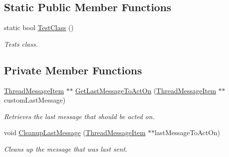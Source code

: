 \subsection*{Static Public Member Functions}
\begin{DoxyCompactItemize}
\item 
static bool \hyperlink{class_thread_single_message_keep_last_adbab8972129d51d509f20d5d575a393b}{TestClass} ()
\begin{DoxyCompactList}\small\item\em Tests class. \item\end{DoxyCompactList}\end{DoxyCompactItemize}
\subsection*{Private Member Functions}
\begin{DoxyCompactItemize}
\item 
\hyperlink{class_thread_message_item}{ThreadMessageItem} $\ast$$\ast$ \hyperlink{class_thread_single_message_keep_last_a464796f2eb757053e4c3befc9022ab48}{GetLastMessageToActOn} (\hyperlink{class_thread_message_item}{ThreadMessageItem} $\ast$$\ast$customLastMessage)
\begin{DoxyCompactList}\small\item\em Retrieves the last message that should be acted on. \item\end{DoxyCompactList}\item 
void \hyperlink{class_thread_single_message_keep_last_a91d926ec436b2d29678d0da6bc37fef7}{CleanupLastMessage} (\hyperlink{class_thread_message_item}{ThreadMessageItem} $\ast$$\ast$lastMessageToActOn)
\begin{DoxyCompactList}\small\item\em Cleans up the message that was last sent. \item\end{DoxyCompactList}\end{DoxyCompactItemize}
